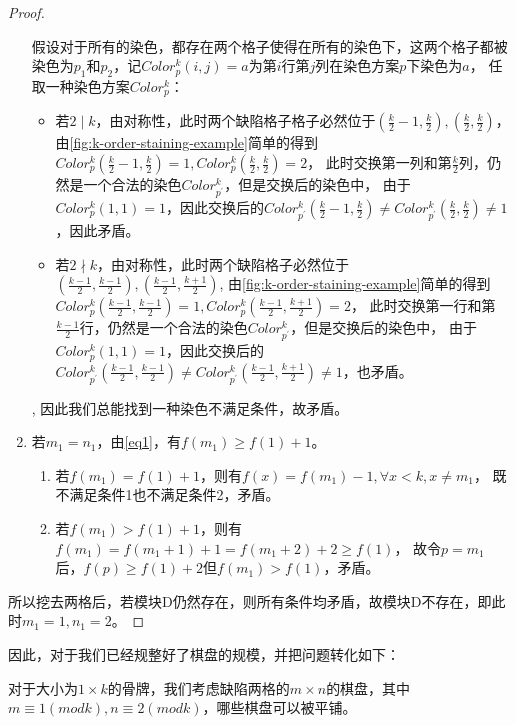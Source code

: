 \begin{proof}
\begin{enumerate}
              假设对于所有的染色，都存在两个格子使得在所有的染色下，这两个格子都被染色为$p_1$和$p_2$，记$Color^k_p(i, j) = a$为第$i$行第$j$列在染色方案$p$下染色为$a$，
              任取一种染色方案$Color^k_p$：
              \begin{itemize}
                  \item 若$2 \mid k$，由对称性，此时两个缺陷格子格子必然位于$(\frac{k}{2} - 1,\frac{k}{2}), (\frac{k}{2},\frac{k}{2})$，
                        由\ref{fig:k-order-staining-example}简单的得到$Color^k_p(\frac{k}{2} - 1,\frac{k}{2}) = 1, Color^k_p(\frac{k}{2},\frac{k}{2}) = 2$，
                        此时交换第一列和第$\frac{k}{2}$列，仍然是一个合法的染色$Color^k_{p^{'}}$，但是交换后的染色中，
                        由于$Color^k_p(1, 1) = 1$，因此交换后的$Color^k_{p^{'}}(\frac{k}{2} - 1,\frac{k}{2}) \neq Color^k_{p^{'}}(\frac{k}{2},\frac{k}{2}) \neq 1$，因此矛盾。
                  \item 若$2 \nmid k$，由对称性，此时两个缺陷格子必然位于$(\frac{k - 1}{2},\frac{k - 1}{2}), (\frac{k - 1}{2},\frac{k + 1}{2})$,
                        由\ref{fig:k-order-staining-example}简单的得到$Color^k_p(\frac{k - 1}{2},\frac{k - 1}{2}) = 1, Color^k_p(\frac{k - 1}{2},\frac{k + 1}{2}) = 2$，
                        此时交换第一行和第$\frac{k - 1}{2}$行，仍然是一个合法的染色$Color^k_{p^{'}}$，但是交换后的染色中，
                        由于$Color^k_p(1, 1) = 1$，因此交换后的$Color^k_{p^{'}}(\frac{k - 1}{2},\frac{k - 1}{2}) \neq Color^k_{p^{'}}(\frac{k - 1}{2},\frac{k + 1}{2}) \neq 1$，也矛盾。
              \end{itemize},
              因此我们总能找到一种染色不满足条件，故矛盾。
        \item 若$m_1 = n_1$，由\ref{eq1}，有$f(m_1) \ge f(1) + 1$。
              \begin{enumerate}
                  \item 若$f(m_1) = f(1) + 1$，则有$f(x) = f(m_1) - 1, \forall x < k, x \neq m_1$， 既不满足条件1也不满足条件2，矛盾。
                  \item 若$f(m_1) > f(1) + 1$，则有$f(m_1) = f(m_1 + 1) + 1 = f(m_1 + 2) + 2 \ge f(1)$， 故令$p = m_1$后，$f(p) \ge f(1) + 2$但$f(m_1) > f(1)$，矛盾。
              \end{enumerate}
    \end{enumerate}

    所以挖去两格后，若模块D仍然存在，则所有条件均矛盾，故模块D不存在，即此时$m_1 = 1, n_1 = 2$。
\end{proof}

因此，对于我们已经规整好了棋盘的规模，并把问题转化如下：

对于大小为$1 \times k$的骨牌，我们考虑缺陷两格的$m \times n$的棋盘，其中$m \equiv 1 (mod k), n \equiv 2 (mod k)$，哪些棋盘可以被平铺。

\clearpage
